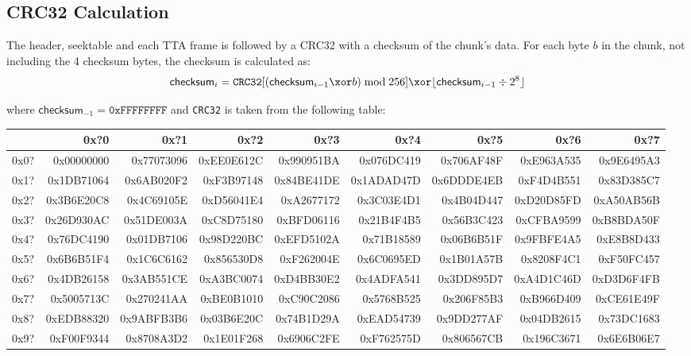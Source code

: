 \subsection{CRC32 Calculation}
\label{tta:crc32}
The header, seektable and each TTA frame is followed
by a CRC32 with a checksum of the chunk's data.
For each byte $b$ in the chunk, not including the 4 checksum bytes,
the checksum is calculated as:
\begin{equation*}
\textsf{checksum}_i = \texttt{CRC32}[(\textsf{checksum}_{i - 1} \xor b) \bmod 256] \xor \lfloor\textsf{checksum}_{i - 1} \div 2 ^ 8\rfloor
\end{equation*}
\par
\noindent
where $\textsf{checksum}_{-1} = \texttt{0xFFFFFFFF}$ and
\texttt{CRC32} is taken from the following table:
\begin{table}[h]
{\ttfamily
\begin{tabular}{|r||r|r|r|r|r|r|r|r|}
\hline
 & 0x?0 & 0x?1 & 0x?2 & 0x?3 & 0x?4 & 0x?5 & 0x?6 & 0x?7 \\
\hline
0x0? &
0x00000000 &  0x77073096 &  0xEE0E612C &  0x990951BA &  0x076DC419 &  0x706AF48F &  0xE963A535 &  0x9E6495A3 \\
0x1? &
0x1DB71064 &  0x6AB020F2 &  0xF3B97148 &  0x84BE41DE &  0x1ADAD47D &  0x6DDDE4EB &  0xF4D4B551 &  0x83D385C7 \\
0x2? &
0x3B6E20C8 &  0x4C69105E &  0xD56041E4 &  0xA2677172 &  0x3C03E4D1 &  0x4B04D447 &  0xD20D85FD &  0xA50AB56B \\
0x3? &
0x26D930AC &  0x51DE003A &  0xC8D75180 &  0xBFD06116 &  0x21B4F4B5 &  0x56B3C423 &  0xCFBA9599 &  0xB8BDA50F \\
0x4? &
0x76DC4190 &  0x01DB7106 &  0x98D220BC &  0xEFD5102A &  0x71B18589 &  0x06B6B51F &  0x9FBFE4A5 &  0xE8B8D433 \\
0x5? &
0x6B6B51F4 &  0x1C6C6162 &  0x856530D8 &  0xF262004E &  0x6C0695ED &  0x1B01A57B &  0x8208F4C1 &  0xF50FC457 \\
0x6? &
0x4DB26158 &  0x3AB551CE &  0xA3BC0074 &  0xD4BB30E2 &  0x4ADFA541 &  0x3DD895D7 &  0xA4D1C46D &  0xD3D6F4FB \\
0x7? &
0x5005713C &  0x270241AA &  0xBE0B1010 &  0xC90C2086 &  0x5768B525 &  0x206F85B3 &  0xB966D409 &  0xCE61E49F \\
0x8? &
0xEDB88320 &  0x9ABFB3B6 &  0x03B6E20C &  0x74B1D29A &  0xEAD54739 &  0x9DD277AF &  0x04DB2615 &  0x73DC1683 \\
0x9? &
0xF00F9344 &  0x8708A3D2 &  0x1E01F268 &  0x6906C2FE &  0xF762575D &  0x806567CB &  0x196C3671 &  0x6E6B06E7 \\

\end{tabular}}
\end{table}
